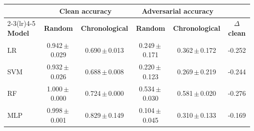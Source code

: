 \begin{tabular}{l c c c c c}
\toprule
& \multicolumn{2}{c}{\textbf{Clean accuracy}} & \multicolumn{2}{c}{\textbf{Adversarial accuracy}} & \\
\cmidrule(lr){2-3}\cmidrule(lr){4-5}
\textbf{Model} & \textbf{Random} & \textbf{Chronological} & \textbf{Random} & \textbf{Chronological} & $\Delta$ \textbf{clean} \\
\midrule
LR & 0.942\,$\pm$\,0.029 & 0.690\,$\pm$\,0.013 & 0.249\,$\pm$\,0.171 & 0.362\,$\pm$\,0.172 & -0.252 \\
SVM & 0.932\,$\pm$\,0.026 & 0.688\,$\pm$\,0.008 & 0.220\,$\pm$\,0.123 & 0.269\,$\pm$\,0.219 & -0.244 \\
RF & 1.000\,$\pm$\,0.000 & 0.724\,$\pm$\,0.000 & 0.534\,$\pm$\,0.030 & 0.581\,$\pm$\,0.020 & -0.276 \\
MLP & 0.998\,$\pm$\,0.001 & 0.829\,$\pm$\,0.149 & 0.104\,$\pm$\,0.045 & 0.310\,$\pm$\,0.133 & -0.169 \\
\bottomrule
\end{tabular}
